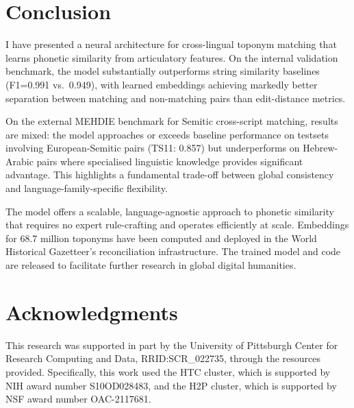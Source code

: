 \documentclass[11pt]{article}
\begin{document}


    \section{Conclusion}
    \label{sec:conclusion}

    I have presented a neural architecture for cross-lingual toponym matching
    that learns phonetic similarity from articulatory features. On the internal
    validation benchmark, the model substantially outperforms string similarity
    baselines (F1=0.991 vs.\ 0.949), with learned embeddings achieving markedly
    better separation between matching and non-matching pairs than edit-distance
    metrics.

    On the external MEHDIE benchmark for Semitic cross-script matching, results
    are mixed: the model approaches or exceeds baseline performance on testsets
    involving European-Semitic pairs (TS11: 0.857) but underperforms on
    Hebrew-Arabic pairs where specialised linguistic knowledge provides
    significant advantage. This highlights a fundamental trade-off between
    global consistency and language-family-specific flexibility.

    The model offers a scalable, language-agnostic approach to phonetic similarity
    that requires no expert rule-crafting and operates efficiently at scale.
    Embeddings for 68.7 million toponyms have been computed and deployed in the
    World Historical Gazetteer's reconciliation infrastructure. The trained model
    and code are released to facilitate further research in global digital
    humanities.



    \section*{Acknowledgments}
    This research was supported in part by the University of Pittsburgh Center for Research Computing and Data, RRID:SCR\_022735, through the resources provided. Specifically, this work used the HTC cluster, which is supported by NIH award number S10OD028483, and the H2P cluster, which is supported by NSF award number OAC-2117681.
\end{document}
